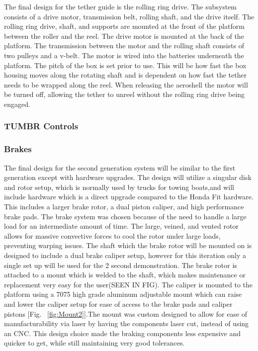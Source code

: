 \indent\indent The final design for the tether guide is the rolling ring drive. The subsystem consists of a drive motor, transmission belt, rolling shaft, and the drive itself. The rolling ring drive, shaft, and supports are mounted at the front of the platform between the roller and the reel. The drive motor is mounted at the back of the platform. The transmission between the motor and the rolling shaft consists of two pulleys and a v-belt. The motor is wired into the batteries underneath the platform. The pitch of the box is set prior to use. This will be how fast the box housing moves along the rotating shaft and is dependent on how fast the tether needs to be wrapped along the reel. When releasing the aeroshell the motor will be turned off, allowing the tether to unreel without the rolling ring drive being engaged. 

\subsubsection{TUMBR Controls}

\subsubsection{Brakes}

\indent\indent The final design for the second generation system will be similar to the first generation except with hardware upgrades. The design will utilize a singular disk and rotor setup, which is normally used by trucks for towing boats,and will include hardware which is a direct upgrade compared to the Honda Fit hardware. This includes a larger brake rotor, a dual piston caliper, and high performance brake pads. The brake system was chosen because of the need to handle a large load for an intermediate amount of time. The large, veined, and vented rotor allows for massive convective forces to cool the rotor under large loads, preventing warping issues. The shaft which the brake rotor will be mounted on is designed to include a dual brake caliper setup, however for this iteration only a single set up will be used for the 2 second demonstration. The brake rotor is attached to a mount which is welded to the shaft, which makes maintenance or replacement very easy for the user(SEEN IN FIG). The caliper is mounted to the platform using a 7075 high grade aluminum adjustable mount which can raise and lower the caliper setup for ease of access to the brake pads and caliper pistons  [Fig. ~\ref{fig:Mount2}].The mount was custom designed to allow for ease of manufacturability via laser by having the components laser cut, instead of using an CNC. This design choice made the braking components less expensive and quicker to get, while still maintaining very good tolerances. 

